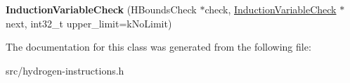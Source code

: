 \begin{DoxyCompactItemize}
\item 
\hypertarget{classv8_1_1internal_1_1_v8___f_i_n_a_l_1_1_induction_variable_check_ad546790cb657fc4558a48adfe9b263ff}{}{\bfseries Induction\+Variable\+Check} (H\+Bounds\+Check $\ast$check, \hyperlink{classv8_1_1internal_1_1_v8___f_i_n_a_l_1_1_induction_variable_check}{Induction\+Variable\+Check} $\ast$next, int32\+\_\+t upper\+\_\+limit=k\+No\+Limit)\label{classv8_1_1internal_1_1_v8___f_i_n_a_l_1_1_induction_variable_check_ad546790cb657fc4558a48adfe9b263ff}

\end{DoxyCompactItemize}


The documentation for this class was generated from the following file\+:\begin{DoxyCompactItemize}
\item 
src/hydrogen-\/instructions.\+h\end{DoxyCompactItemize}
